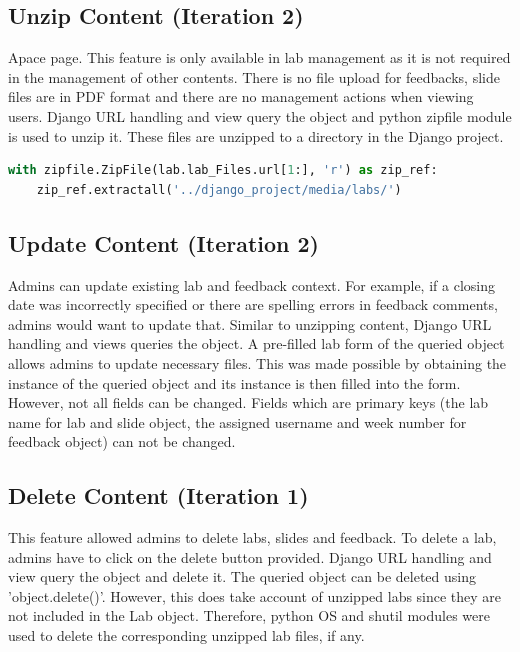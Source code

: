 \documentclass{l4proj}
\begin{document}
\subsection{Unzip Content (Iteration 2)}

Apace page. This feature is only available in lab management as it is not required in the management of other contents. There is no file upload for feedbacks, slide files are in PDF format and there are no management actions when viewing users. Django URL handling and view query the object and python zipfile module is used to unzip it. These files are unzipped to a directory in the Django project.

            
\begin{lstlisting}[language=python, caption={Code snippet from Django's unzip\textunderscore lab view which unzips uploaded zipped files.}, label=lst:unzip_content]
with zipfile.ZipFile(lab.lab_Files.url[1:], 'r') as zip_ref:
    zip_ref.extractall('../django_project/media/labs/')
\end{lstlisting}

\subsection{Update Content (Iteration 2)}

Admins can update existing lab and feedback context. For example, if a closing date was incorrectly specified or there are spelling errors in feedback comments, admins would want to update that. Similar to unzipping content,  Django URL handling and views queries the object. A pre-filled lab form of the queried object allows admins to update necessary files. This was made possible by obtaining the instance of the queried object and its instance is then filled into the form. However, not all fields can be changed. Fields which are primary keys (the lab name for lab and slide object, the assigned username and week number for feedback object) can not be changed. 

\subsection{Delete Content (Iteration 1)}

This feature allowed admins to delete labs, slides and feedback. To delete a lab, admins have to click on the delete button provided. Django URL handling and view query the object and delete it.
The queried object can be deleted using 'object.delete()'. However, this does take account of unzipped labs since they are not included in the Lab object. Therefore, python OS and shutil modules were used to delete the corresponding unzipped lab files, if any.
\end{document}
